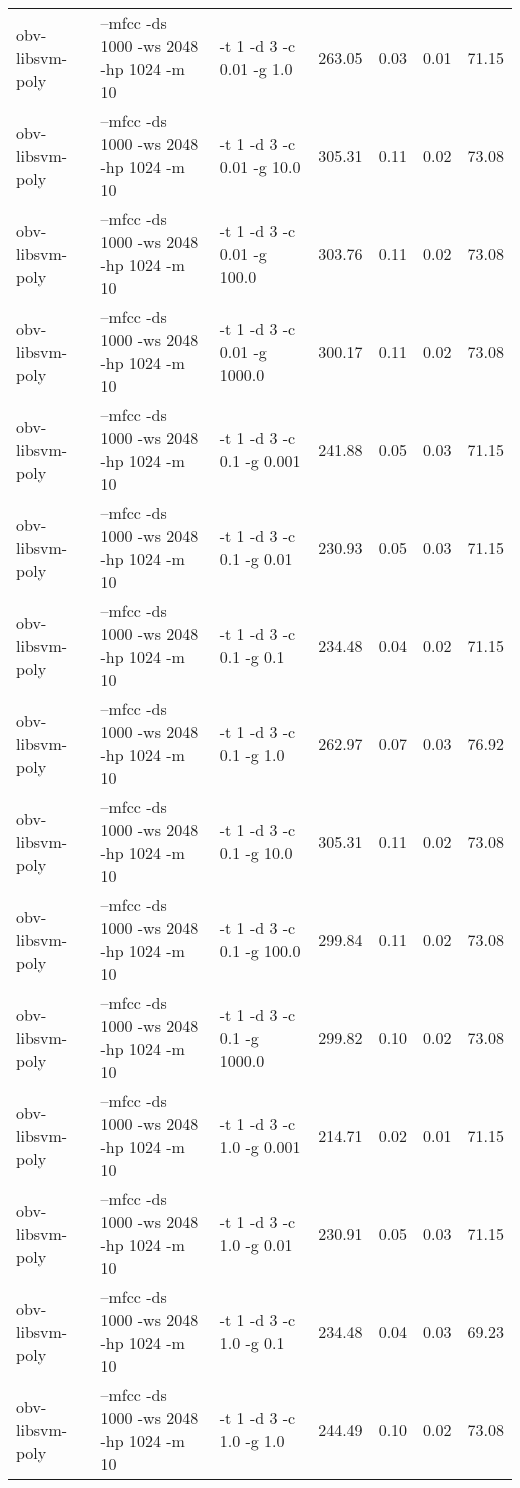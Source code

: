 \documentclass[11pt,a4paper]{article}
\begin{document}
\begin{tabular}{lllrrrr}
 obv-libsvm-poly  &  --mfcc -ds 1000 -ws 2048 -hp 1024 -m 10  &  -t 1 -d 3  -c 0.01   -g 1.0     &  263.05  &  0.03  &  0.01  &  71.15  \\
 obv-libsvm-poly  &  --mfcc -ds 1000 -ws 2048 -hp 1024 -m 10  &  -t 1 -d 3  -c 0.01   -g 10.0    &  305.31  &  0.11  &  0.02  &  73.08  \\
 obv-libsvm-poly  &  --mfcc -ds 1000 -ws 2048 -hp 1024 -m 10  &  -t 1 -d 3  -c 0.01   -g 100.0   &  303.76  &  0.11  &  0.02  &  73.08  \\
 obv-libsvm-poly  &  --mfcc -ds 1000 -ws 2048 -hp 1024 -m 10  &  -t 1 -d 3  -c 0.01   -g 1000.0  &  300.17  &  0.11  &  0.02  &  73.08  \\
 obv-libsvm-poly  &  --mfcc -ds 1000 -ws 2048 -hp 1024 -m 10  &  -t 1 -d 3  -c 0.1    -g 0.001   &  241.88  &  0.05  &  0.03  &  71.15  \\
 obv-libsvm-poly  &  --mfcc -ds 1000 -ws 2048 -hp 1024 -m 10  &  -t 1 -d 3  -c 0.1    -g 0.01    &  230.93  &  0.05  &  0.03  &  71.15  \\
 obv-libsvm-poly  &  --mfcc -ds 1000 -ws 2048 -hp 1024 -m 10  &  -t 1 -d 3  -c 0.1    -g 0.1     &  234.48  &  0.04  &  0.02  &  71.15  \\
 obv-libsvm-poly  &  --mfcc -ds 1000 -ws 2048 -hp 1024 -m 10  &  -t 1 -d 3  -c 0.1    -g 1.0     &  262.97  &  0.07  &  0.03  &  76.92  \\
 obv-libsvm-poly  &  --mfcc -ds 1000 -ws 2048 -hp 1024 -m 10  &  -t 1 -d 3  -c 0.1    -g 10.0    &  305.31  &  0.11  &  0.02  &  73.08  \\
 obv-libsvm-poly  &  --mfcc -ds 1000 -ws 2048 -hp 1024 -m 10  &  -t 1 -d 3  -c 0.1    -g 100.0   &  299.84  &  0.11  &  0.02  &  73.08  \\
 obv-libsvm-poly  &  --mfcc -ds 1000 -ws 2048 -hp 1024 -m 10  &  -t 1 -d 3  -c 0.1    -g 1000.0  &  299.82  &  0.10  &  0.02  &  73.08  \\
 obv-libsvm-poly  &  --mfcc -ds 1000 -ws 2048 -hp 1024 -m 10  &  -t 1 -d 3  -c 1.0    -g 0.001   &  214.71  &  0.02  &  0.01  &  71.15  \\
 obv-libsvm-poly  &  --mfcc -ds 1000 -ws 2048 -hp 1024 -m 10  &  -t 1 -d 3  -c 1.0    -g 0.01    &  230.91  &  0.05  &  0.03  &  71.15  \\
 obv-libsvm-poly  &  --mfcc -ds 1000 -ws 2048 -hp 1024 -m 10  &  -t 1 -d 3  -c 1.0    -g 0.1     &  234.48  &  0.04  &  0.03  &  69.23  \\
 obv-libsvm-poly  &  --mfcc -ds 1000 -ws 2048 -hp 1024 -m 10  &  -t 1 -d 3  -c 1.0    -g 1.0     &  244.49  &  0.10  &  0.02  &  73.08  \\

\end{tabular}
\end{document}

